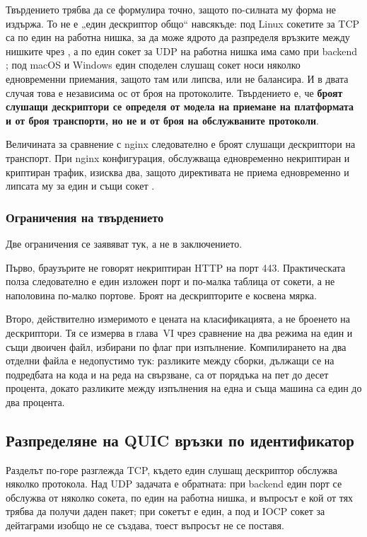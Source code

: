 Твърдението трябва да се формулира точно, защото по-силната му форма не издържа. То не е
„един дескриптор общо“ навсякъде: под Linux сокетите за TCP са по един на работна нишка, за
да може ядрото да разпределя връзките между нишките чрез , а по един
сокет за UDP на работна нишка има само при backend ; под macOS и Windows
един споделен слушащ сокет носи няколко едновременни приемания, защото там
 или липсва, или не балансира. И в двата случая това е независима ос от
броя на протоколите. Твърдението е, че \textbf{броят слушащи дескриптори се определя от модела
на приемане на платформата и от броя транспорти, но не и от броя на обслужваните
протоколи}.

Величината за сравнение с nginx следователно е броят слушащи дескриптори на транспорт.
При nginx конфигурация, обслужваща едновременно некриптиран и криптиран трафик, изисква
два, защото директивата  не приема едновременно  и липсата му за
един и същи сокет \cite{nginxlisten}.

\subsubsection{Ограничения на твърдението}

Две ограничения се заявяват тук, а не в заключението.

Първо, браузърите не говорят некриптиран HTTP на порт 443. Практическата полза
следователно е един изложен порт и по-малка таблица от сокети, а не наполовина по-малко
портове. Броят на дескрипторите е косвена мярка.

Второ, действително измеримото е цената на класификацията, а не броенето на дескриптори.
Тя се измерва в глава~VI чрез сравнение на два режима на един и същи двоичен
файл, избирани по флаг при изпълнение. Компилирането на два отделни файла е недопустимо
тук: разликите между сборки, дължащи се на подредбата на кода и на реда на свързване, са
от порядъка на пет до десет процента, докато разликите между изпълнения на една и съща
машина са един до два процента.

\subsection{Разпределяне на QUIC връзки по идентификатор}
\label{sec:cid}

Разделът по-горе разглежда TCP, където един слушащ дескриптор обслужва няколко
протокола. Над UDP задачата е обратната: при backend  един порт се обслужва
от няколко сокета, по един на работна нишка, и въпросът е кой от тях трябва да получи даден
пакет; при  сокетът е един, а под  и IOCP сокет за дейтаграми
изобщо не се създава, тоест въпросът не се поставя.

